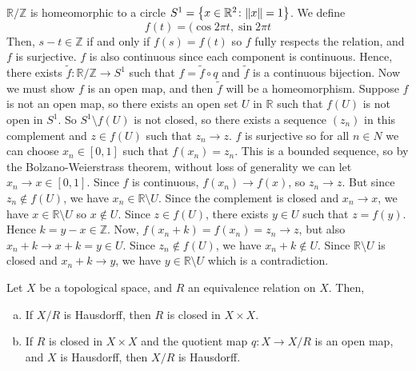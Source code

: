 \begin{example}
	\( \mathbb R / \mathbb Z \) is homeomorphic to a circle \( S^1 = \qty{x \in \mathbb R^2 \colon \norm{x} = 1} \).
	We define
	\[
		f(t) = (\cos 2 \pi t, \sin 2 \pi t
	\]
	Then, \( s - t \in \mathbb Z \) if and only if \( f(s) = f(t) \) so \( f \) fully respects the relation, and \( f \) is surjective.
	\( f \) is also continuous since each component is continuous.
	Hence, there exists \( \widetilde f \colon \mathbb R / \mathbb Z \to S^1 \) such that \( f = \widetilde f \circ q \) and \( \widetilde f \) is a continuous bijection.
	Now we must show \( f \) is an open map, and then \( \widetilde f \) will be a homeomorphism.
	Suppose \( f \) is not an open map, so there exists an open set \( U \) in \( \mathbb R \) such that \( f(U) \) is not open in \( S^1 \).
	So \( S^1 \setminus f(U) \) is not closed, so there exists a sequence \( (z_n) \) in this complement and \( z \in f(U) \) such that \( z_n \to z \).
	\( f \) is surjective so for all \( n \in N \) we can choose \( x_n \in [0,1] \) such that \( f(x_n) = z_n \).
	This is a bounded sequence, so by the Bolzano-Weierstrass theorem, without loss of generality we can let \( x_n \to x \in [0,1] \).
	Since \( f \) is continuous, \( f(x_n) \to f(x) \), so \( z_n \to z \).
	But since \( z_n \not\in f(U) \), we have \( x_n \in \mathbb R \setminus U \).
	Since the complement is closed and \( x_n \to x \), we have \( x \in \mathbb R \setminus U \) so \( x \not\in U \).
	Since \( z \in f(U) \), there exists \( y \in U \) such that \( z = f(y) \).
	Hence \( k = y - x \in \mathbb Z \).
	Now, \( f(x_n + k) = f(x_n) = z_n \to z \), but also \( x_n + k \to x + k = y \in U \).
	Since \( z_n \not\in f(U) \), we have \( x_n + k \not\in U \).
	Since \( \mathbb R \setminus U \) is closed and \( x_n + k \to y \), we have \( y \in \mathbb R \setminus U \) which is a contradiction.
\end{example}
\begin{proposition}
	Let \( X \) be a topological space, and \( R \) an equivalence relation on \( X \).
	Then,
	\begin{enumerate}[(a)]
		\item If \( X / R \) is Hausdorff, then \( R \) is closed in \( X \times X \).
		\item If \( R \) is closed in \( X \times X \) and the quotient map \( q \colon X \to X/R \) is an open map, and \( X \) is Hausdorff, then \( X / R \) is Hausdorff.
	\end{enumerate}
\end{proposition}
